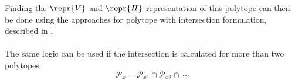 Finding the $\repr{V}$ and $\repr{H}$-representation of this polytope can then be done using the approaches for polytope with intersection formulation, described in .


\paragraph*{} The same logic can be used if the intersection is calculated for more than two polytopes 
\begin{equation}
    \mathcal{P}_x = \mathcal{P}_{x1} \cap \mathcal{P}_{x2} \cap ~\cdots
\end{equation}
